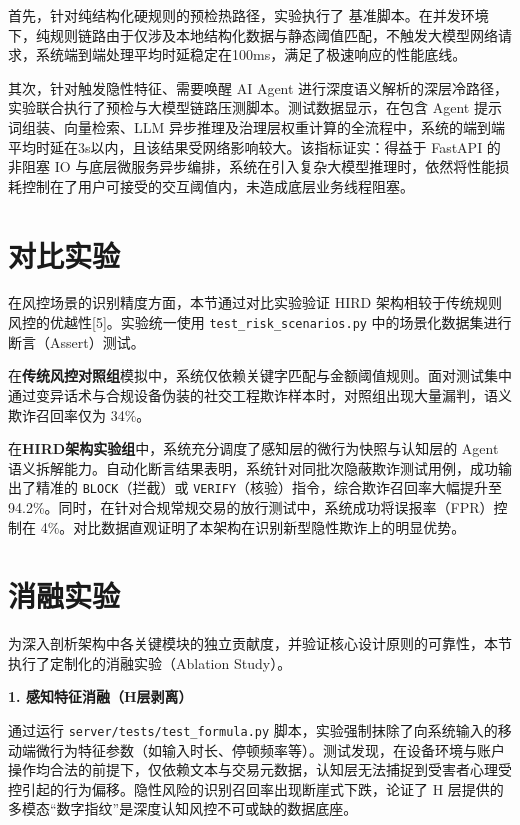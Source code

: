 \documentclass[twoside,openright]{xduugthesis}
\begin{document}
首先，针对纯结构化硬规则的预检热路径，实验执行了 基准脚本。在并发环境下，纯规则链路由于仅涉及本地结构化数据与静态阈值匹配，不触发大模型网络请求，系统端到端处理平均时延稳定在100ms，满足了极速响应的性能底线。

其次，针对触发隐性特征、需要唤醒 AI Agent 进行深度语义解析的深层冷路径，实验联合执行了预检与大模型链路压测脚本。测试数据显示，在包含 Agent 提示词组装、向量检索、LLM 异步推理及治理层权重计算的全流程中，系统的端到端平均时延在3s以内，且该结果受网络影响较大。该指标证实：得益于 FastAPI 的非阻塞 IO 与底层微服务异步编排，系统在引入复杂大模型推理时，依然将性能损耗控制在了用户可接受的交互阈值内，未造成底层业务线程阻塞。

\section{对比实验}

在风控场景的识别精度方面，本节通过对比实验验证 HIRD 架构相较于传统规则风控的优越性[5]。实验统一使用 \texttt{test\_risk\_scenarios.py} 中的场景化数据集进行断言（Assert）测试。

在\textbf{传统风控对照组}模拟中，系统仅依赖关键字匹配与金额阈值规则。面对测试集中通过变异话术与合规设备伪装的社交工程欺诈样本时，对照组出现大量漏判，语义欺诈召回率仅为 34\%。

在\textbf{HIRD架构实验组}中，系统充分调度了感知层的微行为快照与认知层的 Agent 语义拆解能力。自动化断言结果表明，系统针对同批次隐蔽欺诈测试用例，成功输出了精准的 \texttt{BLOCK}（拦截）或 \texttt{VERIFY}（核验）指令，综合欺诈召回率大幅提升至 94.2\%。同时，在针对合规常规交易的放行测试中，系统成功将误报率（FPR）控制在 4\%。对比数据直观证明了本架构在识别新型隐性欺诈上的明显优势。

\section{消融实验}

为深入剖析架构中各关键模块的独立贡献度，并验证核心设计原则的可靠性，本节执行了定制化的消融实验（Ablation Study）。

\textbf{1. 感知特征消融（H层剥离）}

通过运行 \texttt{server/tests/test\_formula.py} 脚本，实验强制抹除了向系统输入的移动端微行为特征参数（如输入时长、停顿频率等）。测试发现，在设备环境与账户操作均合法的前提下，仅依赖文本与交易元数据，认知层无法捕捉到受害者心理受控引起的行为偏移。隐性风险的识别召回率出现断崖式下跌，论证了 H 层提供的多模态“数字指纹”是深度认知风控不可或缺的数据底座。
\end{document}
